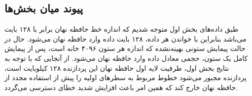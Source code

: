 \documentclass{article}
\begin{document}
\begin{latin}
	\begin{table}[htbp]
		\centering
		\caption{Hardware Counters Comparison}
		\label{tab:hardware_counters_comparison}
	\end{table}
\end{latin}
\FloatBarrier

\subsection{پیوند میان بخش‌ها}
طبق داده‌های بخش اول متوجه شدیم که اندازه خط حافظه نهان  برابر با ۱۲۸ بایت می‌باشد بنابراین با خواندن هر داده، ۱۲۸ بایت داده وارد حافظه نهان می‌شود. حال در حالت پیمایش ستونی بهینه‌نشده که اندازه هر ستون ۴۰۹۶ خانه است، پس از پیمایش کامل یک ستون، حجمی معادل  داده وارد حافظه نهان می‌شود. از آنجایی که با توجه به نتایج بخش اول، ظرفیت لایه اول حافظه نهان  این پردازنده ۱۲۸ کیلوبایت است، پردازنده مجبور می‌شود خطوط  مربوط به سطرهای اولیه را پیش از استفاده مجدد از حافظه نهان خارج کند که همین امر باعث افزایش شدید خطای دسترسی  می‌گردد.
\end{document}
